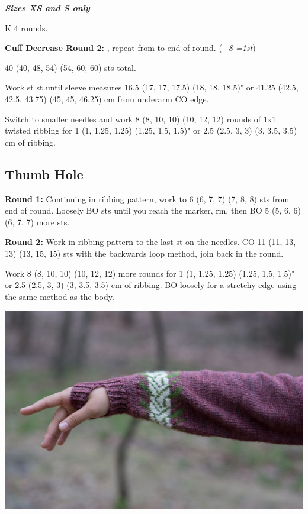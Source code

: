 \documentclass[12pt]{article}
\newcommand{\vocab}[1]{\emph{\textbf{#1}}} %
\newcommand{\rowDir}[1]{\textbf{#1:}} %
\renewcommand{\repeat}[1]{\textbf{\textasteriskcentered[#1]}, repeat from \textasteriskcentered \hspace{1pt}} %
\newcommand{\decrease}[1]{(\emph{$-$#1
	\ifnum#1=1{st}\else{sts}\fi})}
\newenvironment{frnote}
    {%
    	\setlength{\FrameRule}{1.5pt}
    	\def\FrameCommand{\fboxrule=\FrameRule\fboxsep=\FrameSep \fcolorbox{framecolor}{shadecolor}}
    	\MakeFramed {\FrameRestore}}
    {\setlength{\FrameRule}{1pt}
	\endMakeFramed}
\begin{document}
\begin{multicols}{2}
\begin{frnote}
\vocab{Sizes XS and S only}

K 4 rounds.

\rowDir{Cuff Decrease Round 2} \repeat{k4, k2tog} to end of round. \decrease{8}

40 (40, 48, 54) (54, 60, 60) sts total.
\end{frnote}

Work st st until sleeve measures 16.5 (17, 17, 17.5) (18, 18, 18.5)" or 41.25 (42.5, 42.5, 43.75) (45, 45, 46.25) cm from underarm CO edge. 

Switch to smaller needles and work
8 (8, 10, 10) (10, 12, 12) rounds of 1x1 twisted ribbing for  
1 (1, 1.25, 1.25) (1.25, 1.5, 1.5)" or 2.5 (2.5, 3, 3) (3, 3.5, 3.5) cm of ribbing.

\subsection*{Thumb Hole}

\rowDir{Round 1} Continuing in ribbing pattern, work to 
6 (6, 7, 7) (7, 8, 8) sts from end of round. Loosely BO sts until you reach the marker, rm, then BO 
5 (5, 6, 6) (6, 7, 7) more sts.

\rowDir{Round 2} Work in ribbing pattern to the last st on the needles. CO 
11 (11, 13, 13) (13, 15, 15) sts with the backwards loop method, join back in the round.

Work 8 (8, 10, 10) (10, 12, 12) more rounds for 
1 (1, 1.25, 1.25) (1.25, 1.5, 1.5)" or 2.5 (2.5, 3, 3) (3, 3.5, 3.5) cm of ribbing. BO loosely for a stretchy edge using the same method as the body.

\begin{center}
\includegraphics[width=0.9\linewidth]{hand.jpg}
\end{center}


\end{multicols}
\end{document}
